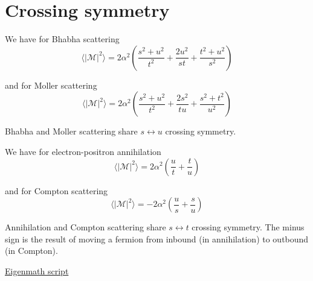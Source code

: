 

\section*{Crossing symmetry}

We have for Bhabha scattering
\begin{equation*}
\langle|\mathcal{M}|^2\rangle=2\alpha^2
\left(\frac{s^2+u^2}{t^2}+\frac{2u^2}{st}+\frac{t^2+u^2}{s^2}\right)
\end{equation*}

and for Moller scattering
\begin{equation*}
\langle|\mathcal{M}|^2\rangle=2\alpha^2
\left(\frac{s^2+u^2}{t^2}+\frac{2s^2}{tu}+\frac{s^2+t^2}{u^2}\right)
\end{equation*}

Bhabha and Moller scattering share $s\leftrightarrow u$ crossing symmetry.

\bigskip
We have for electron-positron annihilation
\begin{equation*}
\langle|\mathcal{M}|^2\rangle=2\alpha^2
\left(\frac{u}{t}+\frac{t}{u}\right)
\end{equation*}

and for Compton scattering
\begin{equation*}
\langle|\mathcal{M}|^2\rangle=-2\alpha^2
\left(\frac{u}{s}+\frac{s}{u}\right)
\end{equation*}

Annihilation and Compton scattering share $s\leftrightarrow t$ crossing symmetry.
The minus sign is the result of moving a fermion from inbound (in annihilation)
to outbound (in Compton).

\bigskip
\href{https://georgeweigt.github.io/examples/crossing-symmetry-demo.html}{Eigenmath script}


